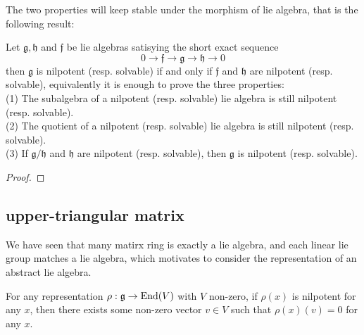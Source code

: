 The two properties will keep stable under the morphism of lie algebra, that is the following result:

\begin{proposition}
    Let \(\mathfrak{g}, \mathfrak{h}\) and \(\mathfrak{f}\) be lie algebras satisying the short exact sequence
    \[0 \to \mathfrak{f} \to \mathfrak{g} \to \mathfrak{h} \to 0\]
    then \(\mathfrak{g}\) is nilpotent (resp. solvable) if and only if \(\mathfrak{f}\) and \(\mathfrak{h}\) are nilpotent (resp. solvable), equivalently it is enough to prove the three properties:\\

    (1) The subalgebra of a nilpotent (resp. solvable) lie algebra is still nilpotent (resp. solvable).\\

    (2) The quotient of a nilpotent (resp. solvable) lie algebra is still nilpotent (resp. solvable).\\

    (3) If \(\mathfrak{g}/\mathfrak{h}\) and \(\mathfrak{h}\) are nilpotent (resp. solvable), then \(\mathfrak{g}\) is nilpotent (resp. solvable).
\end{proposition}

\begin{proof}
    
\end{proof}









\subsection*{upper-triangular matrix}



We have seen that many matirx ring is exactly a lie algebra, and each linear lie group matches a lie algebra, which motivates to consider the representation of an abstract lie algebra.

\begin{colordefinition}
    
\end{colordefinition}

\begin{lemma} \label{lemmaengel}
For any representation \(\rho: \mathfrak{g} \to \operatorname{End}(V)\) with \(V\) non-zero, if \(\rho(x)\) is nilpotent for any \(x\), then there exists some non-zero vector \(v \in V\) such that \(\rho(x)(v) = 0\) for any \(x\).     
\end{lemma}


